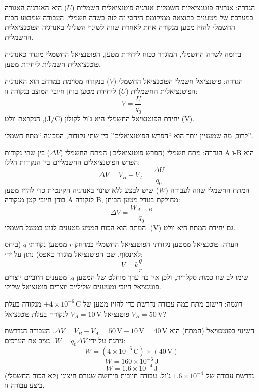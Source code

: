 \documentclass[12pt]{article}
\newcommand{\enquote}[1]{\textquotedblleft #1\textquotedblright}
\begin{document}
\begin{definitionBox}{הגדרה: אנרגיה פוטנציאלית חשמלית}
אנרגיה פוטנציאלית חשמלית (\(U\)) היא האנרגיה האגורה במערכת של מטענים כתוצאה ממיקומם היחסי זה לזה בשדה חשמלי. העבודה שמבצע הכוח החשמלי להזיז מטען מנקודה אחת לאחרת שווה לשינוי השלילי באנרגיה הפוטנציאלית החשמלית.
\end{definitionBox}

בדומה לשדה החשמלי, המוגדר ככוח ליחידת מטען, הפוטנציאל החשמלי מוגדר כאנרגיה פוטנציאלית חשמלית ליחידת מטען.

\begin{definitionBox}{הגדרה: פוטנציאל חשמלי}
הפוטנציאל החשמלי (\(V\)) בנקודה מסוימת במרחב הוא האנרגיה הפוטנציאלית החשמלית (\(U\)) ליחידת מטען בוחן חיובי המוצב בנקודה זו:
\begin{equation*}
V = \frac{U}{q_0}
\end{equation*}
יחידת הפוטנציאל החשמלי היא ג'ול לקולון (\(\text{J}/\text{C}\)), הנקראת וולט (\(\text{V}\)).
\end{definitionBox}

לרוב, מה שמעניין יותר הוא \enquote{הפרש הפוטנציאלים} בין שתי נקודות, המכונה \enquote{מתח חשמלי}.

\begin{definitionBox}{הגדרה: מתח חשמלי (הפרש פוטנציאלים)}
המתח החשמלי (\(\Delta V\)) בין שתי נקודות A ו-B הוא הפרש הפוטנציאלים החשמליים בין הנקודות הללו:
\begin{equation*}
\Delta V = V_B - V_A = \frac{\Delta U}{q_0}
\end{equation*}
המתח החשמלי שווה לעבודה (\(W\)) שיש לבצע ללא שינוי באנרגיה הקינטית כדי להזיז מטען בוחן חיובי קטן מנקודה A לנקודה B, מחולקת בגודל מטען הבוחן:
\begin{equation*}
\Delta V = \frac{W_{A \to B}}{q_0}
\end{equation*}
גם יחידת המתח היא וולט (\(\text{V}\)). המתח הוא הכוח המניע מטענים לנוע במעגל חשמלי.
\end{definitionBox}

\begin{remarkBox}{הערה: פוטנציאל ממטען נקודתי}
הפוטנציאל החשמלי במרחק \(r\) ממטען נקודתי \(q\) (ביחס לאינסוף, שם הפוטנציאל מוגדר כאפס) נתון על ידי:
\[V = k \frac{q}{r}\]
שימו לב שזו כמות סקלרית, ולכן אין בה ערך מוחלט של המטען \(q\). מטענים חיוביים יוצרים פוטנציאל חיובי ומטענים שליליים יוצרים פוטנציאל שלילי.
\end{remarkBox}

\begin{exampleBox}{דוגמה: חישוב מתח}
כמה עבודה נדרשת כדי להזיז מטען של \(+4 \times 10^{-6} \, \text{C}\) מנקודה בעלת פוטנציאל \(V_A = 10 \, \text{V}\) לנקודה בעלת פוטנציאל \(V_B = 50 \, \text{V}\)?

השינוי בפוטנציאל (המתח) הוא \(\Delta V = V_B - V_A = 50 \, \text{V} - 10 \, \text{V} = 40 \, \text{V}\).
העבודה הנדרשת ניתנת על ידי \(W = q_0 \Delta V\).
נציב את הערכים:
\[W = (4 \times 10^{-6} \, \text{C}) \times (40 \, \text{V})\]
\[W = 160 \times 10^{-6} \, \text{J}\]
\[W = 1.6 \times 10^{-4} \, \text{J}\]
נדרשת עבודה של \(1.6 \times 10^{-4}\) ג'ול. עבודה חיובית פירושה שגורם חיצוני (לא הכוח החשמלי) ביצע עבודה זו.
\end{exampleBox}
\end{document}
